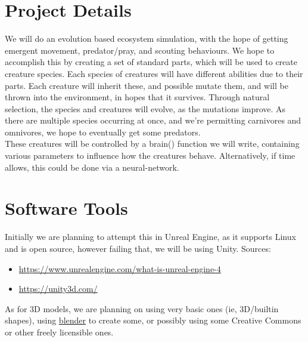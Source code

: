 \documentclass[runningheads]{llncs}
\begin{document}
\section{Project Details}
We will do an evolution based ecosystem simulation, with the hope of getting emergent movement, predator/pray, and scouting behaviours. We hope to accomplish this by creating a set of standard parts, which will be used to create creature species. Each species of creatures will have different abilities due to their parts. Each creature will inherit these, and possible mutate them, and will be thrown into the environment, in hopes that it survives. Through natural selection, the species and creatures will evolve, as the mutations improve. As there are multiple species occurring at once, and we're permitting carnivores and omnivores, we hope to eventually get some predators.\\
These creatures will be controlled by a brain() function we will write, containing various parameters to influence how the creatures behave. Alternatively, if time allows, this could be done via a neural-network.
%
\section{Software Tools}
Initially we are planning to attempt this in Unreal Engine, as it supports Linux and is open source, however failing that, we will be using Unity.
Sources:
\begin{itemize}
\item \url{https://www.unrealengine.com/what-is-unreal-engine-4}
\item \url{https://unity3d.com/}
\end{itemize}
As for 3D models, we are planning on using very basic ones (ie, 3D/builtin shapes), using \href{https://www.blender.org/}{blender} to create some, or possibly using some Creative Commons or other freely licensible ones.
%
\end{document}
